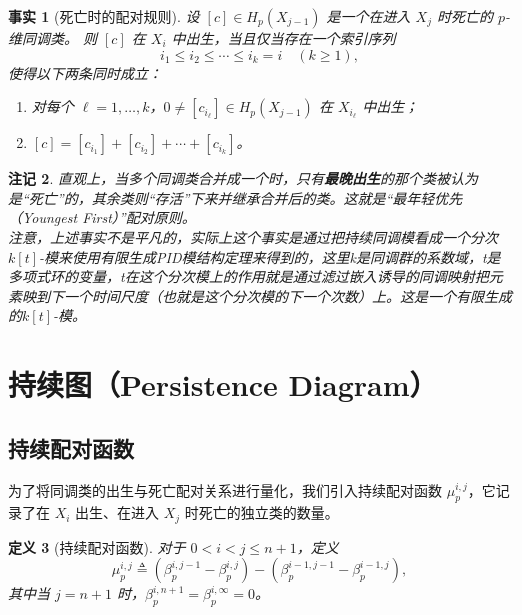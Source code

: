 \documentclass[UTF8]{ctexart}
\newtheorem{definition}{定义}[section]
\newtheorem{remark}[definition]{注记}
\newtheorem{fact}[definition]{事实}
\begin{document}
\begin{fact}[死亡时的配对规则]
\label{fact:youngest-first}
设 \([c] \in H_p(X_{j-1})\) 是一个在进入 \(X_j\) 时死亡的 \(p\)-维同调类。
则 \([c]\) 在 \(X_i\) 中出生，当且仅当存在一个索引序列
\[
i_1 \le i_2 \le \cdots \le i_k = i \quad (k \ge 1),
\]
使得以下两条同时成立：
\begin{enumerate}
    \item 对每个 \(\ell = 1,\dots,k\)，\(0 \neq [c_{i_\ell}] \in H_p(X_{j-1})\) 在 \(X_{i_\ell}\) 中出生；
    \item \([c] = [c_{i_1}] + [c_{i_2}] + \cdots + [c_{i_k}]\)。
\end{enumerate}
\end{fact}

\begin{remark}
直观上，当多个同调类合并成一个时，只有\textbf{最晚出生}的那个类被认为是“死亡”的，其余类则“存活”下来并继承合并后的类。这就是“最年轻优先（Youngest First）”配对原则。\\
注意，上述事实不是平凡的，实际上这个事实是通过把持续同调模看成一个分次$k[t]$-模来使用有限生成PID模结构定理来得到的，这里k是同调群的系数域，t是多项式环的变量，t在这个分次模上的作用就是通过滤过嵌入诱导的同调映射把元素映到下一个时间尺度（也就是这个分次模的下一个次数）上。这是一个有限生成的$k[t]$-模。\\
\end{remark}

\section{持续图（Persistence Diagram）}
\label{sec:persistence-diagram}

\subsection{持续配对函数}
\label{subsec:pairing-function}

为了将同调类的出生与死亡配对关系进行量化，我们引入持续配对函数 \(\mu_p^{i,j}\)，它记录了在 \(X_i\) 出生、在进入 \(X_j\) 时死亡的独立类的数量。

\begin{definition}[持续配对函数]
\label{def:pairing-function}
对于 \(0 < i < j \le n+1\)，定义
\[
\mu_p^{i,j} \triangleq \left(\beta_p^{i,j-1} - \beta_p^{i,j}\right) - \left(\beta_p^{i-1,j-1} - \beta_p^{i-1,j}\right),
\]
其中当 \(j = n+1\) 时，\(\beta_p^{i,n+1} = \beta_p^{i,\infty} = 0\)。
\end{definition}
\end{document}
